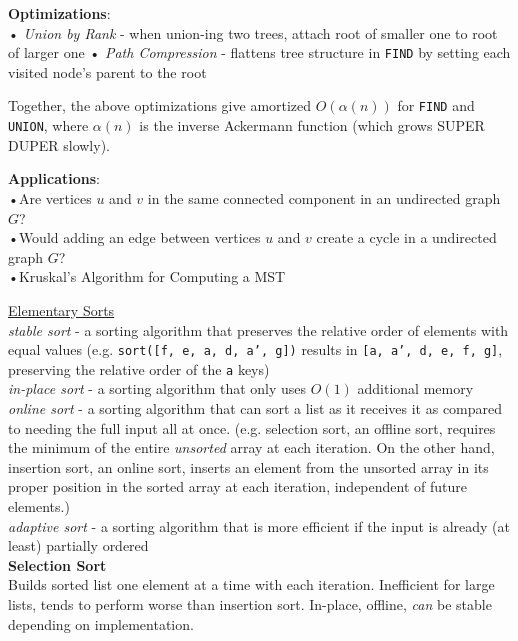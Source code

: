\documentclass[12pt, fleqn]{general}
\begin{document}
\begin{multicols*}{2}
    \textbf{Optimizations}:\\
    • \emph{Union by Rank} - when union-ing two trees, attach root of smaller one to root of larger one
    • \emph{Path Compression} - flattens tree structure in \texttt{FIND} by setting each visited node's parent to the root

    Together, the above optimizations give amortized $O(\alpha(n))$ for \texttt{FIND} and \texttt{UNION}, where $\alpha(n)$ is the inverse Ackermann function (which grows SUPER DUPER slowly).

    \textbf{Applications}:\\
    •Are vertices $u$ and $v$ in the same connected component in an undirected graph $G$?\\
    •Would adding an edge between vertices $u$ and $v$ create a cycle in a undirected graph $G$?\\
    •Kruskal's Algorithm for Computing a MST

    \newpage

    {\large \underline{Elementary Sorts}}\\

    \emph{stable sort} - a sorting algorithm that preserves the relative order of elements with equal values (e.g. \texttt{sort([f, e, a, d, a', g])} results in \texttt{[a, a', d, e, f, g]}, preserving the relative order of the \texttt{a} keys)\\

    \emph{in-place sort} - a sorting algorithm that only uses $O(1)$ additional memory\\

    \emph{online sort} - a sorting algorithm that can sort a list as it receives it as compared to needing the full input all at once. (e.g. selection sort, an offline sort, requires the minimum of the entire \emph{unsorted} array at each iteration. On the other hand, insertion sort, an online sort, inserts an element from the unsorted array in its proper position in the sorted array at each iteration, independent of future elements.)\\

    \emph{adaptive sort} - a sorting algorithm that is more efficient if the input is already (at least) partially ordered\\

    \textbf{Selection Sort}\\

    Builds sorted list one element at a time with each iteration. Inefficient for large lists, tends to perform worse than insertion sort. In-place, offline, \emph{can} be stable depending on implementation.\\


\end{multicols*}
\end{document}

